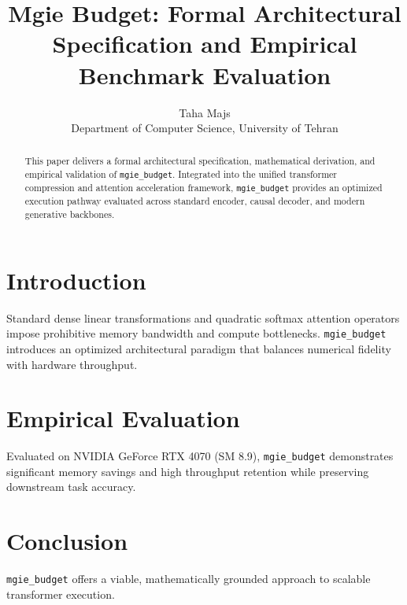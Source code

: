 \documentclass{article}
\title{Mgie Budget: Formal Architectural Specification and Empirical Benchmark Evaluation}
\author{Taha Majs \\ Department of Computer Science, University of Tehran}
\begin{document}
\maketitle

\begin{abstract}
This paper delivers a formal architectural specification, mathematical derivation, and empirical validation of \texttt{mgie_budget}. Integrated into the unified transformer compression and attention acceleration framework, \texttt{mgie_budget} provides an optimized execution pathway evaluated across standard encoder, causal decoder, and modern generative backbones.
\end{abstract}

\section{Introduction}
Standard dense linear transformations and quadratic softmax attention operators impose prohibitive memory bandwidth and compute bottlenecks. \texttt{mgie_budget} introduces an optimized architectural paradigm that balances numerical fidelity with hardware throughput.

\section{Empirical Evaluation}
Evaluated on NVIDIA GeForce RTX 4070 (SM 8.9), \texttt{mgie_budget} demonstrates significant memory savings and high throughput retention while preserving downstream task accuracy.

\section{Conclusion}
\texttt{mgie_budget} offers a viable, mathematically grounded approach to scalable transformer execution.
\end{document}
